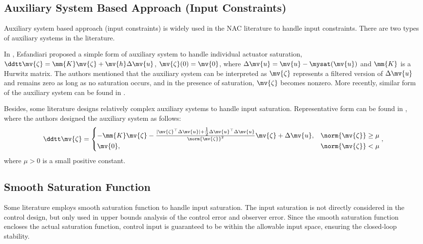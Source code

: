\subsection{Auxiliary System Based Approach (Input Constraints)}

Auxiliary system based approach (input constraints) is widely used in the NAC literature to handle input constraints.
There are two types of auxiliary systems in the literature.

\hfill

In \cite{Esfandiari:2014aa,Esfandiari:2015aa}, Esfandiari \etal proposed a simple form of auxiliary system to handle individual actuator saturation, \ie $\ddtt\mv{\zeta} = \mm{K}\mv{\zeta}+\mv{h}\Delta\mv{u}$, $\mv{\zeta}(0) = \mv{0}$, where $\Delta \mv{u} = \mv{u} - \mysat(\mv{u})$ and $\mm{K}$ is a Hurwitz matrix.
The authors mentioned that the auxiliary system can be interpreted as $\mv{\zeta}$ represents a filtered version of $\Delta\mv{u}$ and remains zero as long as no saturation occurs, and in the presence of saturation, $\mv{\zeta}$ becomes nonzero.
More recently, similar form of the auxiliary system can be found in \cite{Yu:2022aa}.

\hfill

Besides, some literature designs relatively complex auxiliary systems to handle input saturation.
Representative form can be found in \cite{He:2016aa,Zhao:2016aa,Gao:2026aa}, where the authors designed the auxiliary system as follows:
\begin{equation}
    \ddtt \mv{\zeta} =
    \begin{cases}
        -\mm{K}\mv{\zeta}
        -
        \tfrac{
            \vert \mv{\zeta}^\top \Delta \mv{u} \vert
            + 
            \tfrac{1}{2} \Delta \mv{u}^\top \Delta \mv{u}
        }{\norm{\mv{\zeta}}^2}
        \mv{\zeta}
        +
        \Delta \mv{u}
        , & \norm{\mv{\zeta}} \ge \mu
        \\
        \mv{0}
        , & \norm{\mv{\zeta}} < \mu
    \end{cases}
    ,
\end{equation}
where $\mu > 0$ is a small positive constant.

\subsection{Smooth Saturation Function}

Some literature employs smooth saturation function to handle input saturation.
The input saturation is not directly considered in the control design, but only used in upper bounds analysis of the control error and observer error.
Since the smooth saturation function encloses the actual saturation function, control input is guaranteed to be within the allowable input space, ensuring the closed-loop stability.

